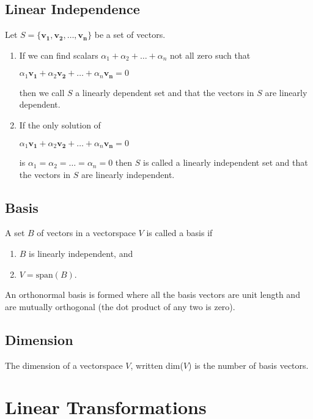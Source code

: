 \documentclass[a4paper,10pt]{article}
\begin{document}
\subsection*{Linear Independence}
Let $S = \{\mathbf{v_1}, \mathbf{v_2}, \dots, \mathbf{v_n}\}$ be a set of vectors.
\begin{enumerate}
\renewcommand{\labelenumi}{\roman{enumi})}
\item If we can find scalars $\alpha_1 + \alpha_2 + \dots + \alpha_n$ not all zero such that
\begin{center}$\alpha_1\mathbf{v_1} + \alpha_2\mathbf{v_2} + \dots + \alpha_n\mathbf{v_n} = 0$\end{center}
then we call $S$ a linearly dependent set and that the vectors in $S$ are linearly dependent.

\item If the only solution of
\begin{center}$\alpha_1\mathbf{v_1} + \alpha_2\mathbf{v_2} + \dots + \alpha_n\mathbf{v_n} = 0$\end{center}
is $\alpha_1 = \alpha_2 = \dots = \alpha_n = 0$ then $S$ is called a linearly independent set and that the vectors in $S$ are linearly independent.
\end{enumerate}

\subsection*{Basis}
A set $B$ of vectors in a vectorspace $V$ is called a basis if
\begin{enumerate}
\renewcommand{\labelenumi}{\roman{enumi})}
\item $B$ is linearly independent, and
\item $V = \mbox{span}(B)$.
\end{enumerate}

An orthonormal basis is formed where all the basis vectors are unit length and are mutually orthogonal (the dot product of any two is zero).

\subsection*{Dimension}
The dimension of a vectorspace $V$, written dim($V$) is the number of basis vectors.

\section*{Linear Transformations}
\end{document}
